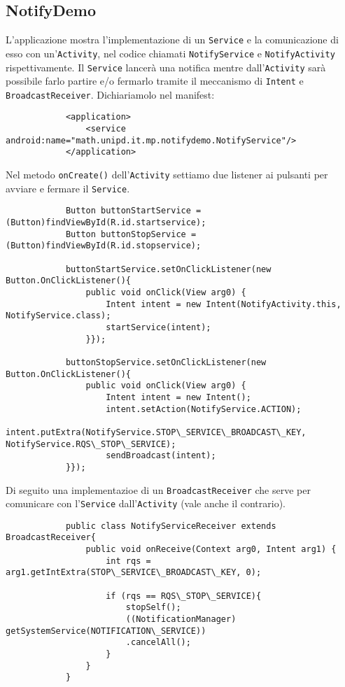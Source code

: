	\subsection{NotifyDemo}
		L'applicazione mostra l'implementazione di un \lstinline|Service| e la comunicazione di esso con un'\lstinline|Activity|, nel codice chiamati \lstinline|NotifyService| e \lstinline|NotifyActivity| rispettivamente. Il \lstinline|Service| lancerà una notifica mentre dall'\lstinline|Activity| sarà possibile farlo partire e/o fermarlo tramite il meccanismo di \lstinline|Intent| e \lstinline|BroadcastReceiver|.
		Dichiariamolo nel manifest:
		\begin{lstlisting}
			<application>
				<service android:name="math.unipd.it.mp.notifydemo.NotifyService"/>
			</application>
		\end{lstlisting}
		
		Nel metodo \lstinline|onCreate()| dell'\lstinline|Activity| settiamo due listener ai pulsanti per avviare e fermare il \lstinline|Service|.
		\begin{lstlisting}
			Button buttonStartService = (Button)findViewById(R.id.startservice);
			Button buttonStopService = (Button)findViewById(R.id.stopservice);
			
			buttonStartService.setOnClickListener(new Button.OnClickListener(){
				public void onClick(View arg0) {
					Intent intent = new Intent(NotifyActivity.this, NotifyService.class);
					startService(intent);
				}});
			
			buttonStopService.setOnClickListener(new Button.OnClickListener(){
				public void onClick(View arg0) {
					Intent intent = new Intent();
					intent.setAction(NotifyService.ACTION);
					intent.putExtra(NotifyService.STOP\_SERVICE\_BROADCAST\_KEY, NotifyService.RQS\_STOP\_SERVICE);
					sendBroadcast(intent);
			}});
		\end{lstlisting}
		
		Di seguito una implementazioe di un \lstinline|BroadcastReceiver| che serve per comunicare con l'\lstinline|Service| dall'\lstinline|Activity| (vale anche il contrario).
		\begin{lstlisting}
			public class NotifyServiceReceiver extends BroadcastReceiver{
				public void onReceive(Context arg0, Intent arg1) {
					int rqs = arg1.getIntExtra(STOP\_SERVICE\_BROADCAST\_KEY, 0);
					
					if (rqs == RQS\_STOP\_SERVICE){
						stopSelf();
						((NotificationManager) getSystemService(NOTIFICATION\_SERVICE))
						.cancelAll();
					}
				}
			}
		\end{lstlisting}
		
